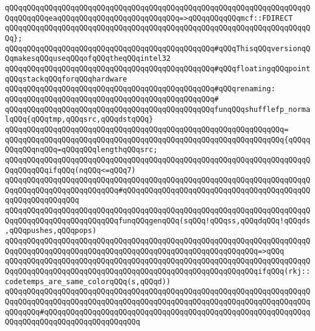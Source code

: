\verb|qQQqqQQqqQQqqQQqqQQqqQQqqQQqqQQqqQQqqQQqqQQqqQQqqQQqqQQqqQQqqQQqqQQqqQQqqQQqqQQqeaqQQqqQQqqQQqqQQqqQQqqQQqqQQq=>qQQqqQQqqQQqmcf::FDIRECT|\newline
\verb|qQQqqQQqqQQqqQQqqQQqqQQqqQQqqQQqqQQqqQQqqQQqqQQqqQQqqQQqqQQqqQQqqQQqqQQq};|\newline
\newline
\verb|qQQqqQQqqQQqqQQqqQQqqQQqqQQqqQQqqQQqqQQqqQQqqQQq#qQQqThisqQQqversionqQQqmakesqQQquseqQQqofqQQqtheqQQqintel32|\newline
\verb|qQQqqQQqqQQqqQQqqQQqqQQqqQQqqQQqqQQqqQQqqQQqqQQq#qQQqfloatingqQQqpointqQQqstackqQQqforqQQqhardware|\newline
\verb|qQQqqQQqqQQqqQQqqQQqqQQqqQQqqQQqqQQqqQQqqQQqqQQq#qQQqrenaming:|\newline
\verb|qQQqqQQqqQQqqQQqqQQqqQQqqQQqqQQqqQQqqQQqqQQqqQQq#|\newline
\verb|qQQqqQQqqQQqqQQqqQQqqQQqqQQqqQQqqQQqqQQqqQQqqQQqfunqQQqshufflefp_normalqQQq{qQQqtmp,qQQqsrc,qQQqdstqQQq}|\newline
\verb|qQQqqQQqqQQqqQQqqQQqqQQqqQQqqQQqqQQqqQQqqQQqqQQqqQQqqQQqqQQqqQQq=|\newline
\verb|qQQqqQQqqQQqqQQqqQQqqQQqqQQqqQQqqQQqqQQqqQQqqQQqqQQqqQQqqQQqqQQq{qQQqqQQqqQQqnqQQq=qQQqqQQqlengthqQQqsrc;|\newline
\newline
\verb|qQQqqQQqqQQqqQQqqQQqqQQqqQQqqQQqqQQqqQQqqQQqqQQqqQQqqQQqqQQqqQQqqQQqqQQqqQQqqQQqifqQQq(nqQQq<=qQQq7)|\newline
\verb|qQQqqQQqqQQqqQQqqQQqqQQqqQQqqQQqqQQqqQQqqQQqqQQqqQQqqQQqqQQqqQQqqQQqqQQqqQQqqQQqqQQqqQQqqQQqqQQq#qQQqqQQqqQQqqQQqqQQqqQQqqQQqqQQqqQQqqQQqqQQqqQQqqQQqqQQqqQQq|\newline
\verb|qQQqqQQqqQQqqQQqqQQqqQQqqQQqqQQqqQQqqQQqqQQqqQQqqQQqqQQqqQQqqQQqqQQqqQQqqQQqqQQqqQQqqQQqqQQqqQQqfunqQQqgenqQQq(sqQQq!qQQqss,qQQqdqQQq!qQQqds,qQQqpushes,qQQqpops)|\newline
\verb|qQQqqQQqqQQqqQQqqQQqqQQqqQQqqQQqqQQqqQQqqQQqqQQqqQQqqQQqqQQqqQQqqQQqqQQqqQQqqQQqqQQqqQQqqQQqqQQqqQQqqQQqqQQqqQQqqQQqqQQqqQQqqQQq=>qQQq|\newline
\verb|qQQqqQQqqQQqqQQqqQQqqQQqqQQqqQQqqQQqqQQqqQQqqQQqqQQqqQQqqQQqqQQqqQQqqQQqqQQqqQQqqQQqqQQqqQQqqQQqqQQqqQQqqQQqqQQqqQQqqQQqqQQqqQQqifqQQq(rkj::codetemps_are_same_colorqQQq(s,qQQqd))|\newline
\verb|qQQqqQQqqQQqqQQqqQQqqQQqqQQqqQQqqQQqqQQqqQQqqQQqqQQqqQQqqQQqqQQqqQQqqQQqqQQqqQQqqQQqqQQqqQQqqQQqqQQqqQQqqQQqqQQqqQQqqQQqqQQqqQQqqQQqqQQqqQQqqQQqqQQq#qQQqqQQqqQQqqQQqqQQqqQQqqQQqqQQqqQQqqQQqqQQqqQQqqQQqqQQqqQQqqQQqqQQqqQQqqQQqqQQqqQQqqQQqqQQq|\newline
